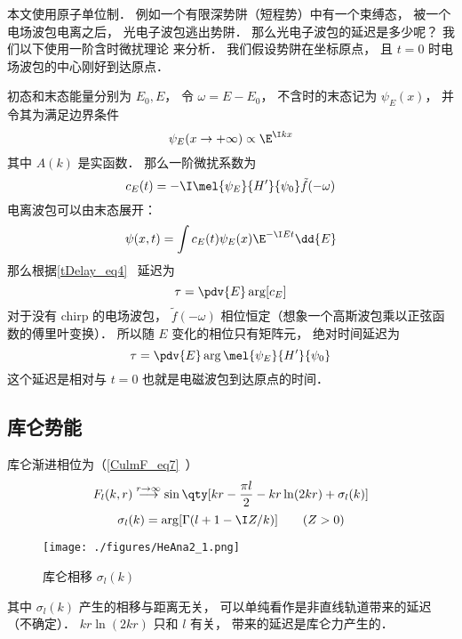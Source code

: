 
\begin{issues}
\issueDraft
\end{issues}


本文使用原子单位制． 例如一个有限深势阱（短程势）中有一个束缚态， 被一个电场波包电离之后， 光电子波包逃出势阱． 那么光电子波包的延迟是多少呢？ 我们以下使用一阶含时微扰理论 来分析． 我们假设势阱在坐标原点， 且 $t = 0$ 时电场波包的中心刚好到达原点．

初态和末态能量分别为 $E_0, E$， 令 $\omega = E - E_0$， 不含时的末态记为 $\psi_E(x)$， 并令其为满足边界条件
\begin{equation}\label{HeAna2_eq2}
\psi_E(x \to +\infty) \propto \E^{\I kx}
\end{equation}
其中 $A(k)$ 是实函数． 那么一阶微扰系数为
\begin{equation}
c_E(t) = -\I  \mel{\psi_E}{H'}{\psi_0} \tilde f(-\omega)
\end{equation}
电离波包可以由末态展开：
\begin{equation}
\psi(x, t) = \int c_E(t) \psi_E(x)\E^{-\I E t} \dd{E}
\end{equation}
那么根据\autoref{tDelay_eq4}~ 延迟为
\begin{equation}
\tau = \pdv{E} \arg [c_E]
\end{equation}
对于没有 chirp 的电场波包， $\tilde f(-\omega)$ 相位恒定（想象一个高斯波包乘以正弦函数的傅里叶变换）． 所以随 $E$ 变化的相位只有矩阵元， 绝对时间延迟为
\begin{equation}\label{HeAna2_eq1}
\tau = \pdv{E} \arg \mel{\psi_E}{H'}{\psi_0}
\end{equation}
这个延迟是相对与 $t = 0$ 也就是电磁波包到达原点的时间．


\subsection{库仑势能}
库仑渐进相位为（\autoref{CulmF_eq7}~）
\begin{equation}
F_l(k, r) \overset{r\to \infty}{\longrightarrow} \sin\qty[kr - \frac{\pi l}{2} - kr\ln(2kr) + \sigma_l(k)]
\end{equation}
\begin{equation}
\sigma_l(k) = \arg[\Gamma(l+1-\I Z/k)] \qquad (Z > 0)
\end{equation}
\begin{figure}[ht]
\centering
\texttt{[image: ./figures/HeAna2\_1.png]}
\caption{库仑相移 $\sigma_l(k)$} \label{HeAna2_fig1}
\end{figure}
其中 $\sigma_l(k)$ 产生的相移与距离无关， 可以单纯看作是非直线轨道带来的延迟（不确定）． $kr\ln(2kr)$ 只和 $l$ 有关， 带来的延迟是库仑力产生的．

